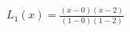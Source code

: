 \documentclass[preview]{standalone}
\begin{document}
\begin{align*}
L_1(x) = \frac{(x - 0)(x - 2)}{(1 - 0)(1 - 2)}
\end{align*}
\end{document}
